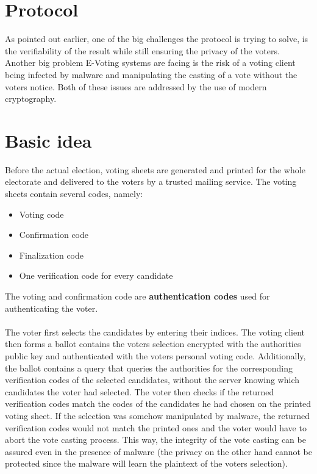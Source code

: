 \documentclass[a4paper,12pt]{report}
\theoremstyle{definition}
\begin{document}
\section{Protocol}
As pointed out earlier, one of the big challenges the protocol is trying to solve, is the verifiability of the result while still ensuring the privacy of the voters. Another big problem E-Voting systems are facing is the risk of a voting client being infected by malware and manipulating the casting of a vote without the voters notice. Both of these issues are addressed by the use of modern cryptography.
\section{Basic idea}
Before the actual election, voting sheets are generated and printed for the whole electorate and delivered to the voters by a trusted mailing service. The voting sheets contain several codes, namely:
\begin{itemize}
	\item Voting code
	\item Confirmation code
	\item Finalization code
	\item One verification code for every candidate
\end{itemize}
The voting and confirmation code are \textbf{authentication codes} used for authenticating the voter.\\\\
The voter first selects the candidates by entering their indices. The voting client then forms a ballot contains the voters selection encrypted with the authorities public key and authenticated with the voters personal voting code. Additionally, the ballot contains a query that queries the authorities for the corresponding verification codes of the selected candidates, without the server knowing which candidates the voter had selected. The voter then checks if the returned verification codes match the codes of the candidates he had chosen on the printed voting sheet. If the selection was somehow manipulated by malware, the returned verification codes would not match the printed ones and the voter would have to abort the vote casting process. This way, the integrity of the vote casting can be assured even in the presence of malware (the privacy on the other hand cannot be protected since the malware will learn the plaintext of the voters selection).
\end{document}
